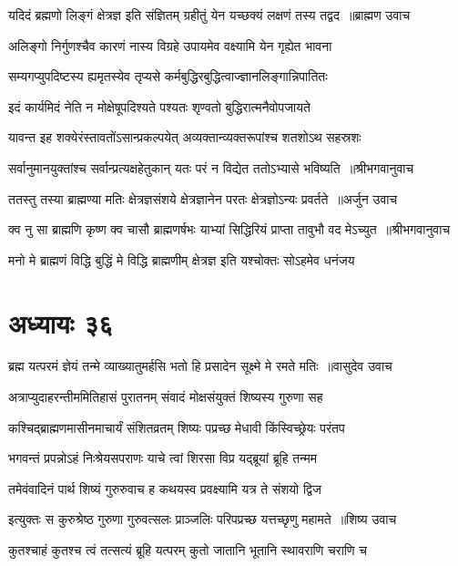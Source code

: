 \threelineshloka
{यदिदं ब्रह्मणो लिङ्गं क्षेत्रज्ञ इति संज्ञितम्}
{ग्रहीतुं येन यच्छक्यं लक्षणं तस्य तद्वद ॥ब्राह्मण उवाच}
{}


\twolineshloka
{अलिङ्गो निर्गुणश्चैव कारणं नास्य विग्रहे}
{उपायमेव वक्ष्यामि येन गृह्येत भावना}


\threelineshloka
{सम्यगप्युपदिष्टस्य ह्यमृतस्येव तृप्यसे}
{कर्मबुद्धिरबुद्धित्वाज्ज्ञानलिङ्गान्निपातितः}
{}


\twolineshloka
{इदं कार्यमिदं नेति न मोक्षेषूपदिश्यते}
{पश्यतः शृण्वतो बुद्धिरात्मनैवोपजायते}


\twolineshloka
{यावन्त इह शक्येरंस्तावतोंऽसान्प्रकल्पयेत्}
{अव्यक्तान्व्यक्तरूपांश्च शतशोऽथ सहस्रशः}


\threelineshloka
{सर्वानुमानयुक्तांश्च सर्वान्प्रत्यक्षहेतुकान्}
{यतः परं न विद्येत ततोऽभ्यासे भविष्यति ॥श्रीभगवानुवाच}
{}


\threelineshloka
{ततस्तु तस्या ब्राह्मण्या मतिः क्षेत्रज्ञसंशये}
{क्षेत्रज्ञानेन परतः क्षेत्रज्ञोऽन्यः प्रवर्तते ॥अर्जुन उवाच}
{}


\threelineshloka
{क्व नु सा ब्राह्मणि कृष्ण क्व चासौ ब्राह्मणर्षभः}
{याभ्यां सिद्धिरियं प्राप्ता तावुभौ वद मेऽच्युत ॥श्रीभगवानुवाच}
{}


\twolineshloka
{मनो मे ब्राह्मणं विद्धि बुद्धिं मे विद्धि ब्राह्मणीम्}
{क्षेत्रज्ञ इति यश्चोक्तः सोऽहमेव धनंजय}


\chapter{अध्यायः ३६}
\threelineshloka
{ब्रह्म यत्परमं ज्ञेयं तन्मे व्याख्यातुमर्हसि}
{भतो हि प्रसादेन सूक्ष्मे मे रमते मतिः ॥वासुदेव उवाच}
{}


\twolineshloka
{अत्राप्युदाहरन्तीममितिहासं पुरातनम्}
{संवादं मोक्षसंयुक्तं शिष्यस्य गुरुणा सह}


\twolineshloka
{कश्चिद्ब्राह्मणमासीनमाचार्यं संशितव्रतम्}
{शिष्यः पप्रच्छ मेधावी किंस्विच्छ्रेयः परंतप}


\twolineshloka
{भगवन्तं प्रपन्नोऽहं निःश्रेयसपराणः}
{याचे त्वां शिरसा विप्र यद्ब्रूयां ब्रूहि तन्मम}


\twolineshloka
{तमेवंवादिनं पार्थ शिष्यं गुरुरुवाच ह}
{कथयस्व प्रवक्ष्यामि यत्र ते संशयो द्विज}


\threelineshloka
{इत्युक्तः स कुरुश्रेष्ठ गुरुणा गुरुवत्सलः}
{प्राञ्जलिः परिपप्रच्छ यत्तच्छृणु महामते ॥शिष्य उवाच}
{}


\twolineshloka
{कुतश्चाहं कुतश्च त्वं तत्सत्यं ब्रूहि यत्परम्}
{कुतो जातानि भूतानि स्थावराणि चराणि च}



